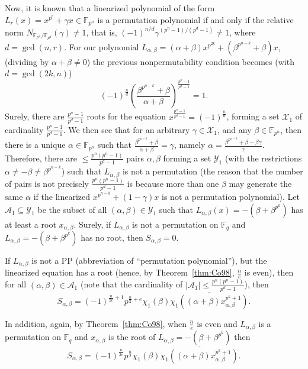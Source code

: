 \documentclass[11pt]{article}
\def\F{{\mathbb F}}
\newcommand{\sA}{\mathscr{A}}
\newcommand{\sX}{\mathscr{X}}
\newcommand{\sY}{\mathscr{Y}}
\begin{document}
Now, it is known that a linearized polynomial of the form $L_r(x)=x^{p^r}+\gamma x\in\F_{p^n}$ is a permutation polynomial if and only if the relative norm $N_{\F_{p^n}/\F_{p^d}}(\gamma)\neq 1$, that is, $(-1)^{n/d} \gamma^{(p^n-1)/(p^d-1)}\neq 1$, where $d=\gcd(n,r)$. For our polynomial $L_{\alpha,\beta}=(\alpha+\beta)x^{p^{2k}}+(\beta^{p^{n-k}}+\beta)x$, (dividing by $\alpha+\beta\neq 0$) the previous nonpermutability condition becomes (with $d=\gcd(2k,n)$)
\begin{equation}
\label{eq:pp_eq}
(-1)^{\frac{n}{d}}\left(\frac{\beta^{p^{n-k}}+\beta}{\alpha+\beta} \right)^{\frac{p^n-1}{p^d-1}}=1.
\end{equation}
Surely, there are  $\frac{p^n-1}{p^d-1}$ roots for the equation $x^{\frac{p^n-1}{p^d-1}}=(-1)^{\frac{n}{d}}$, forming a set $\sX_1$ of cardinality $\frac{p^n-1}{p^d-1}$. We then see that for an arbitrary $\gamma\in \sX_1$, and any $\beta\in\F_{p^n}$, then there is a unique $\alpha\in\F_{p^n}$ such that $\frac{\beta^{p^{n-k}}+\beta}{\alpha+\beta}=\gamma$, namely $\alpha=\frac{\beta^{p^{n-k}}+\beta-\beta \gamma}{\gamma}$. Therefore, there are $\leq \frac{p^n(p^n-1)}{p^d-1}$ pairs $\alpha,\beta$ forming a set $\sY_1$ (with the restrictions $\alpha\neq -\beta\neq \beta^{p^{n-k}}$)  such that $L_{\alpha,\beta}$ is not a permutation (the reason that the number of pairs is not precisely $ \frac{p^n(p^n-1)}{p^d-1}$ is because more than one $\beta$ may generate the same $\alpha$ if the linearized $x^{p^{n-k}}+(1-\gamma)x$ is not a permutation polynomial).   Let $\mathscr{A}_1\subseteq \sY_1$ be the subset of all $(\alpha, \beta)\in\sY_1$ such that $L_{\alpha,\beta}(x)=-(\beta+\beta^{p^k})$ has at least a root $x_{\alpha,\beta}$. 
Surely, if $L_{\alpha,\beta}$ is not a permutation on $\F_q$ and $L_{\alpha,\beta}=-(\beta+\beta^{p^k})$ has no root, then  $S_{\alpha,\beta}=0$.

If $L_{\alpha,\beta}$ is not a PP (abbreviation of ``permutation polynomial''), but the  linearized equation has a root (hence, by Theorem~\ref{thm:Co98},   $\frac{n}{e}$ is even), then for all  $(\alpha,\beta)\in \sA_1$ (note that the cardinality of $|\sA_1|\leq \frac{p^n(p^n-1)}{p^d-1}$), then 
\[
S_{\alpha,\beta}=(-1)^{\frac{n}{2e}+1}p^{\frac{n}{2}+e} \chi_1(\beta) \overline{\chi_1\left((\alpha+\beta) x_{\alpha,\beta}^{p^k+1}\right)}.
\]

In addition, again, by Theorem~\ref{thm:Co98}, when $\frac{n}{e}$ is even   and $L_{\alpha,\beta}$ is a permutation on $\F_q$ and $x_{\alpha,\beta}$ is the root of $L_{\alpha,\beta}=-(\beta+\beta^{p^k})$ then 
\[
S_{\alpha,\beta}=(-1)^{\frac{n}{2e}}p^{\frac{n}{2}}  \chi_1(\beta) \overline{\chi_1\left((\alpha+\beta) x_{\alpha,\beta}^{p^k+1}\right)}.
\]
\end{document}
